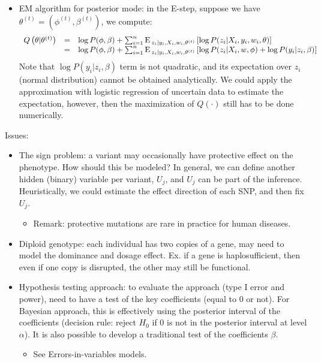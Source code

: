 \documentclass[11pt]{article}
\def\E{{\rm E}\,}
\begin{document}
\begin{enumerate}
\begin{itemize}
\item EM algorithm for posterior mode: in the E-step, suppose we have $\theta^{(t)}=(\phi^{(t)}, \beta^{(t)})$, we compute: 
\begin{equation}
\begin{array}{lll}
Q\left(\theta|\theta^{(t)}\right) &	= & \log P(\phi, \beta) + \sum_{i=1}^n \E_{z_i|y_i,X_i,w_i,\theta^{(t)}} \left[ \log P(z_i|X_i,y_i,w_i,\theta)\right]\\
 & = & \log P(\phi, \beta) + \sum_{i=1}^n \E_{z_i|y_i,X_i,w_i,\theta^{(t)}} \left[ \log P(z_i|X_i,w,\phi) + \log P(y_i|z_i,\beta)\right]
\end{array}
\end{equation} 
Note that $\log P(y_i|z_i,\beta)$ term is not quadratic, and its expectation over $z_i$ (normal distribution) cannot be obtained analytically. We could apply the approximation with logistic regression of uncertain data to estimate the expectation, however, then the maximization of $Q(\cdot)$ still has to be done numerically. 
\end{itemize}

Issues: 
\begin{itemize}
\item The sign problem: a variant may occasionally have protective effect on the phenotype. How should this be modeled? In general, we can define another hidden (binary) variable per variant, $U_j$, and $U_j$ can be part of the inference. Heuristically, we could estimate the effect direction of each SNP, and then fix $U_j$. 
\begin{itemize}
	\item Remark: protective mutations are rare in practice for human diseases. 
\end{itemize}

\item Diploid genotype: each individual has two copies of a gene, may need to model the dominance and dosage effect. Ex. if a gene is haplosufficient, then even if one copy is disrupted, the other may still be functional. 

\item Hypothesis testing approach: to evaluate the approach (type I error and power), need to have a test of the key coefficients (equal to 0 or not). For Bayesian approach, this is effectively using the posterior interval of the coefficients (decision rule: reject $H_0$ if 0 is not in the posterior interval at level $\alpha$). It is also possible to develop a traditional test of the coefficients $\beta$. 
\begin{itemize}
	\item See Errors-in-variables models. 
\end{itemize}


\end{itemize}
\end{enumerate}
\end{document}

